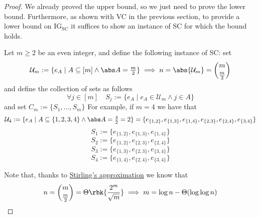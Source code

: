 \documentclass[a4paper, 12pt]{report}
\begin{document}
    \begin{proof}
        We already proved the upper bound, so we just need to prove the lower bound. Furthermore, as shown with VC in the previous section, to provide a lower bound on $\mathrm{IG_{SC}}$ it suffices to show an instance of SC for which the bound holds.

        Let $m \ge 2$ be an even integer, and define the following instance of SC: set $$\mathcal U_m := \{e_A \mid A \subseteq [m] \land \abs A  = \tfrac{m}{2}\} \implies n = \abs{\mathcal U_m}= \binom{m}{\tfrac{m}{2}}$$ and define the collection of sets as follows $$\forall j \in [m] \quad S_j := \{e_A \mid e_A \in \mathcal U_m \land j \in A\}$$ and set $C_m := \{S_1, \ldots, S_m\}$ For example, if $m = 4$ we have that $$\mathcal U_4 := \{e_A \mid A \subseteq \{1, 2, 3, 4\} \land \abs A = \tfrac{4}{2} = 2\} = \{e_{\{1, 2\}}, e_{\{1, 3\}}, e_{\{1, 4\}}, e_{\{2, 3\}}, e_{\{2, 4\}}, e_{\{3, 4\}}\}$$ $$S_1 := \{e_{\{1,2\}}, e_{\{1, 3\}}, e_{\{1,4\}}\}$$ $$S_2 := \{e_{\{1, 2\}}, e_{\{2, 3\}}, e_{\{2,4\}}\}$$ $$S_3 := \{e_{\{1, 3\}}, e_{\{2, 3\}}, e_{\{3, 4\}}\}$$ $$S_4 := \{e_{\{1, 4\}}, e_{\{2, 4\}}, e_{\{3, 4\}}\}$$

        Note that, thanks to \href{https://en.wikipedia.org/wiki/Stirling%27s_approximation}{Stirling's approximation} we know that $$n = \binom{m}{\tfrac{m}{2}} = \Theta \rbk{\dfrac{2^m}{\sqrt m}} \implies m = \log n - \Theta(\log \log n)$$


\end{proof}
\end{document}
